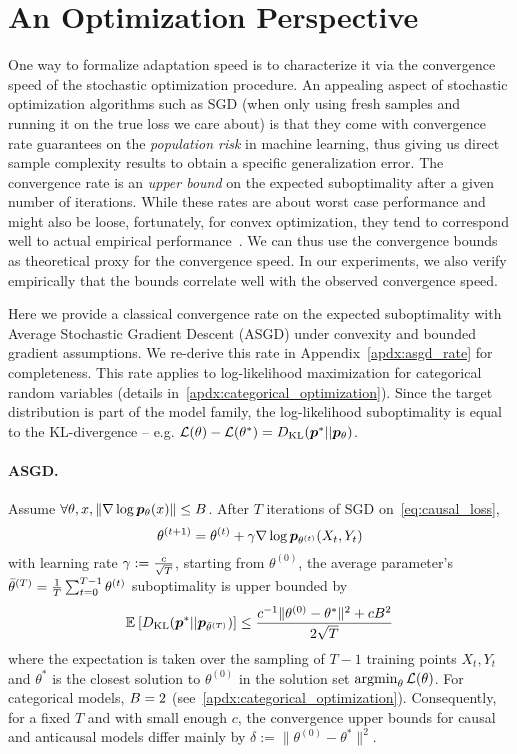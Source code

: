 \section{An Optimization Perspective}
\label{sec:opt_alg}
One way to formalize adaptation speed is to characterize it via the convergence speed of the stochastic optimization procedure. An appealing aspect of stochastic optimization algorithms such as SGD (when only using fresh samples and running it on the true loss we care about) is that they come with convergence rate guarantees on the \emph{population risk} in machine learning, thus giving us direct sample complexity results to obtain a specific generalization error.
The convergence rate is an \emph{upper bound} on the expected suboptimality after a given number of iterations.
While these rates are about worst case performance and might also be loose, fortunately, for convex optimization, they tend to correspond well to actual empirical performance~\citep{nesterov2004Intro}.
We can thus use the convergence bounds as theoretical proxy for the convergence speed.
In our experiments, we also verify empirically that the bounds correlate well with the observed convergence speed.

Here we provide a classical convergence rate on the expected suboptimality with Average Stochastic Gradient Descent (ASGD) under convexity and bounded gradient assumptions. 
We re-derive this rate in Appendix~\ref{apdx:asgd_rate} for completeness.
This rate applies to log-likelihood maximization for categorical random variables (details in~\ref{apdx:categorical_optimization}). 
Since the target distribution is part of the model family, the log-likelihood suboptimality is equal to the KL-divergence  -- e.g. ${\mathcal L}(\theta) - {\mathcal L}(\theta^*) = D_{\mathrm{KL}}(\bm{p}^* || \bm{p}_\theta)$.

\paragraph{ASGD.} 
Assume $\forall \theta, x, \|\nabla \log \bm{p}_\theta(x) \| \leq B$.
After $T$ iterations of SGD on~\eqref{eq:causal_loss},
\begin{equation}
    \theta^{(t+1)} = \theta^{(t)} + \gamma \nabla \log \bm{p}_{\theta^{(t)}}(X_t,Y_t)
\end{equation}
with learning rate $\gamma := \frac{c}{\sqrt{T}}$,
starting from $\theta^{(0)}$,
the average parameter's $\bar \theta^{(T)} = \frac{1}{T} \sum_{t=0}^{T-1} \theta^{(t)}$ suboptimality  is upper bounded by
\begin{align}
    \mathbb{E}_{} \left[ D_{\mathrm{KL}}(\bm{p}^*||\bm{p}_{\bar \theta^{(T)}}) \right] 
    \leq \frac{
    c^{-1} \|\theta^{(0)} - \theta^* \|^2
     + c B^2}{2 \sqrt{T}}
    \label{eq:sgd_rate}
\end{align}
where the expectation is taken over the sampling of $T-1$ training points $X_t,Y_t$ and $\theta^*$ is the closest solution to $\theta^{(0)}$ in the solution set
$\operatorname*{argmin}_\theta {\mathcal L}(\theta)$. 
For categorical models, $B=2$ (see~\ref{apdx:categorical_optimization}).
Consequently, for a fixed $T$ and with small enough $c$, the convergence upper bounds for causal and anticausal models  differ mainly by $\delta := \|\theta^{(0)} - \theta^* \|^2$.



